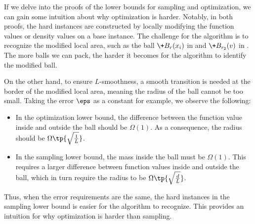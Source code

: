 \begin{remark}
    If we delve into the proofs of the lower bounds for sampling and optimization, we can gain some intuition about why optimization is harder. Notably, in both proofs, the hard instances are constructed by locally modifying the function values or density values on a base instance. The challenge for the algorithm is to recognize the modified local area, such as the ball $\+B_r(x_i)$ in  and $\+B_{r_2}(v)$ in . The more balls we can pack, the harder it becomes for the algorithm to identify the modified ball.

    On the other hand, to ensure $L$-smoothness, a smooth transition is needed at the border of the modified local area, meaning the radius of the ball cannot be too small. Taking the error $\eps$ as a constant for example, we observe the following:
    \begin{itemize}
        \item In the optimization lower bound, the difference between the function value inside and outside the ball should be $\Omega(1)$. As a consequence, the radius should be $\Omega\tp{\sqrt{\frac{1}{L}}}$.
        \item In the sampling lower bound, the mass inside the ball must be $\Omega(1)$. This requires a larger difference between function values inside and outside the ball, which in turn require the radius to be $\Omega\tp{\sqrt{\frac{d}{L}}}$.
    \end{itemize}
    Thus, when the error requirements are the same, the hard instances in the sampling lower bound is easier for the algorithm to recognize. This provides an intuition for why optimization is harder than sampling.
\end{remark}
